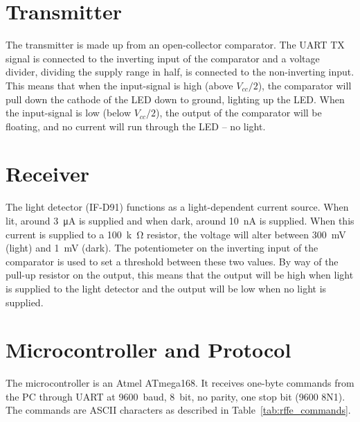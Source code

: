 \section{Transmitter}
The transmitter is made up from an open-collector comparator. The UART TX signal is connected to the inverting input of the comparator and a voltage divider, dividing the supply range in half, is connected to the non-inverting input. This means that when the input-signal is high (above $V_{cc}/2$), the comparator will pull down the cathode of the LED down to ground, lighting up the LED. When the input-signal is low (below $V_{cc}/2$), the output of the comparator will be floating, and no current will run through the LED -- no light.

\section{Receiver}
The light detector (IF-D91) functions as a light-dependent current source. When lit, around \SI{3}{\micro\ampere} is supplied and when dark, around \SI{10}{nA} is supplied. When this current is supplied to a \SI{100}{k\ohm} resistor, the voltage will alter between \SI{300}{mV} (light) and \SI{1}{mV} (dark). The potentiometer on the inverting input of the comparator is used to set a threshold between these two values. By way of the pull-up resistor on the output, this means that the output will be high when light is supplied to the light detector and the output will be low when no light is supplied.

\section{Microcontroller and Protocol}
The microcontroller is an Atmel ATmega168. It receives one-byte commands from the PC through UART at \SI{9600}{baud}, \SI{8}{bit}, no parity, one stop bit (9600 8N1). The commands are ASCII characters as described in Table~\ref{tab:rffe_commands}.

